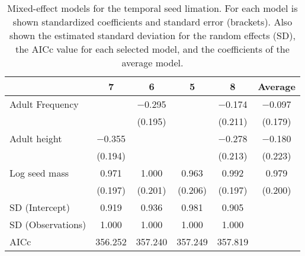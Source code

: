 \begin{table}
\label{tab:SSL_glm}
\caption{Mixed-effect models for the temporal seed limation. For each model is shown standardized coefficients and standard error (brackets). Also shown the estimated standard deviation for the random effects (SD), the AICc value for each selected model, and the coefficients of the average model.}
\centering
\begin{tabular}[t]{lccccc}
\toprule
  & 7 & 6 & 5 & 8 & Average\\
\midrule
Adult Frequency &  & \num{-0.295} &  & \num{-0.174} & \num{-0.097}\\
 &  & (\num{0.195}) &  & (\num{0.211}) & (\num{0.179})\\
Adult height & \num{-0.355} &  &  & \num{-0.278} & \num{-0.180}\\
 & (\num{0.194}) &  &  & (\num{0.213}) & (\num{0.223})\\
Log seed mass & \num{0.971} & \num{1.000} & \num{0.963} & \num{0.992} & \num{0.979}\\
 & (\num{0.197}) & (\num{0.201}) & (\num{0.206}) & (\num{0.197}) & (\num{0.200})\\
SD (Intercept) & \num{0.919} & \num{0.936} & \num{0.981} & \num{0.905} & \\
SD (Observations) & \num{1.000} & \num{1.000} & \num{1.000} & \num{1.000} & \\
\midrule
AICc & \num{356.252} & \num{357.240} & \num{357.249} & \num{357.819} & \\
\bottomrule
\end{tabular}
\end{table}
